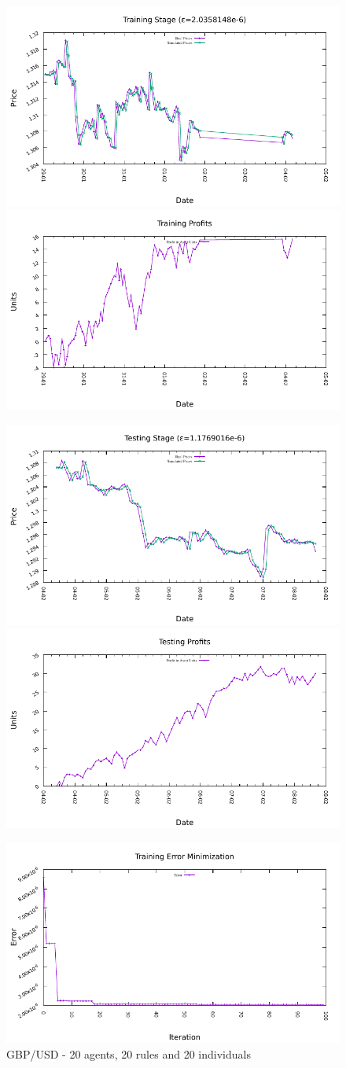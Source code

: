 \begin{figure}[htp]
  \centering

  \includegraphics[width=.45\textwidth]{img/plots/gbp_usd_h1-20agents-20rules-20ind-100gen_training_fit.pdf}\quad
  \includegraphics[width=.45\textwidth]{img/plots/gbp_usd_h1-20agents-20rules-20ind-100gen_training_profits.pdf}

  \medskip

  \includegraphics[width=.45\textwidth]{img/plots/gbp_usd_h1-20agents-20rules-20ind-100gen_testing_fit.pdf}\quad
  \includegraphics[width=.45\textwidth]{img/plots/gbp_usd_h1-20agents-20rules-20ind-100gen_testing_profits.pdf}

  \medskip

  \includegraphics[width=.45\textwidth]{img/plots/gbp_usd_h1-20agents-20rules-20ind-100gen_error_minimization.pdf}

  \caption{GBP/USD - 20 agents, 20 rules and 20 individuals}
  \label{figure:gbp-usd-20agents-20rules-20individuals}
\end{figure}








